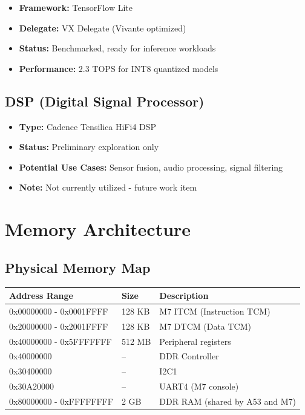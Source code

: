 \documentclass[12pt,a4paper]{report}
\begin{document}
\begin{itemize}
    \item \textbf{Framework:} TensorFlow Lite
    \item \textbf{Delegate:} VX Delegate (Vivante optimized)
    \item \textbf{Status:} Benchmarked, ready for inference workloads
    \item \textbf{Performance:} 2.3 TOPS for INT8 quantized models
\end{itemize}

\subsection{DSP (Digital Signal Processor)}

\begin{itemize}
    \item \textbf{Type:} Cadence Tensilica HiFi4 DSP
    \item \textbf{Status:} Preliminary exploration only
    \item \textbf{Potential Use Cases:} Sensor fusion, audio processing, signal filtering
    \item \textbf{Note:} Not currently utilized - future work item
\end{itemize}
\section{Memory Architecture}

\subsection{Physical Memory Map}

\begin{center}
\begin{tabular}{|l|l|l|}
\hline
\textbf{Address Range} & \textbf{Size} & \textbf{Description} \\
\hline
0x00000000 - 0x0001FFFF & 128 KB & M7 ITCM (Instruction TCM) \\
0x20000000 - 0x2001FFFF & 128 KB & M7 DTCM (Data TCM) \\
0x40000000 - 0x5FFFFFFF & 512 MB & Peripheral registers \\
0x40000000 & -- & DDR Controller \\
0x30400000 & -- & I2C1 \\
0x30A20000 & -- & UART4 (M7 console) \\
0x80000000 - 0xFFFFFFFF & 2 GB & DDR RAM (shared by A53 and M7) \\
\hline
\end{tabular}
\end{center}
\end{document}

